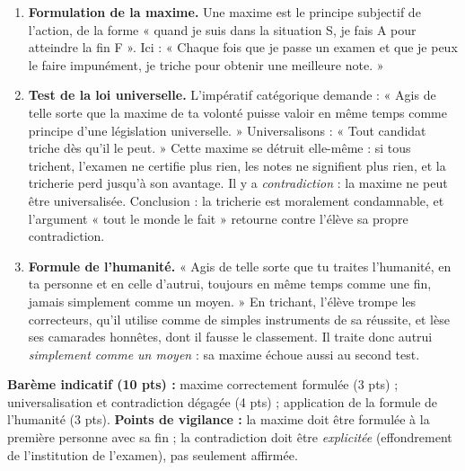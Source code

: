 \documentclass[11pt]{article}
\begin{document}
\begin{corrige}
\begin{enumerate}
\item \textbf{Formulation de la maxime.} Une maxime est le principe subjectif de l'action, de la forme « quand je suis dans la situation S, je fais A pour atteindre la fin F ». Ici : « Chaque fois que je passe un examen et que je peux le faire impunément, je triche pour obtenir une meilleure note. »
\item \textbf{Test de la loi universelle.} L'impératif catégorique demande : « Agis de telle sorte que la maxime de ta volonté puisse valoir en même temps comme principe d'une législation universelle. » Universalisons : « Tout candidat triche dès qu'il le peut. » Cette maxime se détruit elle-même : si tous trichent, l'examen ne certifie plus rien, les notes ne signifient plus rien, et la tricherie perd jusqu'à son avantage. Il y a \emph{contradiction} : la maxime ne peut être universalisée. Conclusion : la tricherie est moralement condamnable, et l'argument « tout le monde le fait » retourne contre l'élève sa propre contradiction.
\item \textbf{Formule de l'humanité.} « Agis de telle sorte que tu traites l'humanité, en ta personne et en celle d'autrui, toujours en même temps comme une fin, jamais simplement comme un moyen. » En trichant, l'élève trompe les correcteurs, qu'il utilise comme de simples instruments de sa réussite, et lèse ses camarades honnêtes, dont il fausse le classement. Il traite donc autrui \emph{simplement comme un moyen} : sa maxime échoue aussi au second test.
\end{enumerate}
\textbf{Barème indicatif (10 pts) :} maxime correctement formulée (3 pts) ; universalisation et contradiction dégagée (4 pts) ; application de la formule de l'humanité (3 pts).
\textbf{Points de vigilance :} la maxime doit être formulée à la première personne avec sa fin ; la contradiction doit être \emph{explicitée} (effondrement de l'institution de l'examen), pas seulement affirmée.
\end{corrige}
\end{document}
